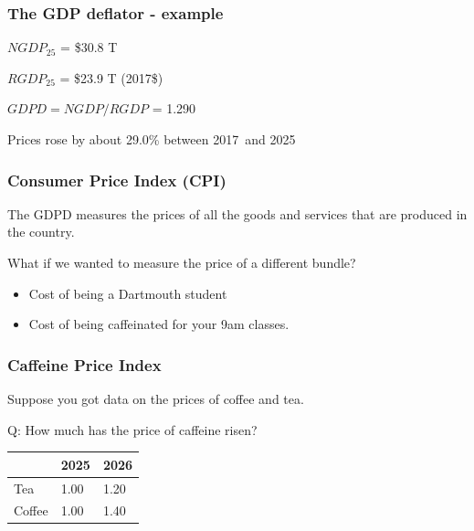 \documentclass[aspectratio=169]{beamer}
\newenvironment{wideitemize}{\itemize\addtolength{\itemsep}{10pt}}{\enditemize}
\newcommand{\thisyear}{2026}
\newcommand{\lastyear}{2025}
\newcommand{\baseyear}{2017}
\newcommand{\lastyearshort}{25}
\begin{document}
\begin{frame}
\frametitle{The GDP deflator - example}

\begin{wideitemize}
\item $NGDP_{\lastyearshort}$ = \$30.8 T
\item $RGDP_{\lastyearshort}$ = \$23.9 T (\baseyear\$)
\item $GDPD = NGDP/RGDP$ = 1.290
\item Prices rose by about 29.0\% between \baseyear \  and \lastyear
\end{wideitemize}
\end{frame}


\begin{frame}
\frametitle{Consumer Price Index (CPI)}

\begin{wideitemize}
\item The GDPD measures the prices of all the goods and services that are produced in the country.

\item What if we wanted to measure the price of a different bundle?
\begin{itemize}
\item Cost of being a Dartmouth student
\item Cost of being caffeinated for your 9am classes.
\end{itemize}
\end{wideitemize}
\end{frame}

\begin{frame}
\frametitle{Caffeine Price Index}
\begin{wideitemize}
\item Suppose you got data on the prices of coffee and tea.
\end{wideitemize}
\begin{wideitemize}
\item Q:  How much has the price of caffeine risen?
\end{wideitemize}
\begin{center}
\begin{tabular}{|l|l|l|} \hline
 & \lastyear & \thisyear  \\ \hline
Tea & 1.00 & 1.20  \\ \hline
Coffee & 1.00 & 1.40  \\ \hline
\end{tabular}
\end{center}
\end{frame}
\end{document}

